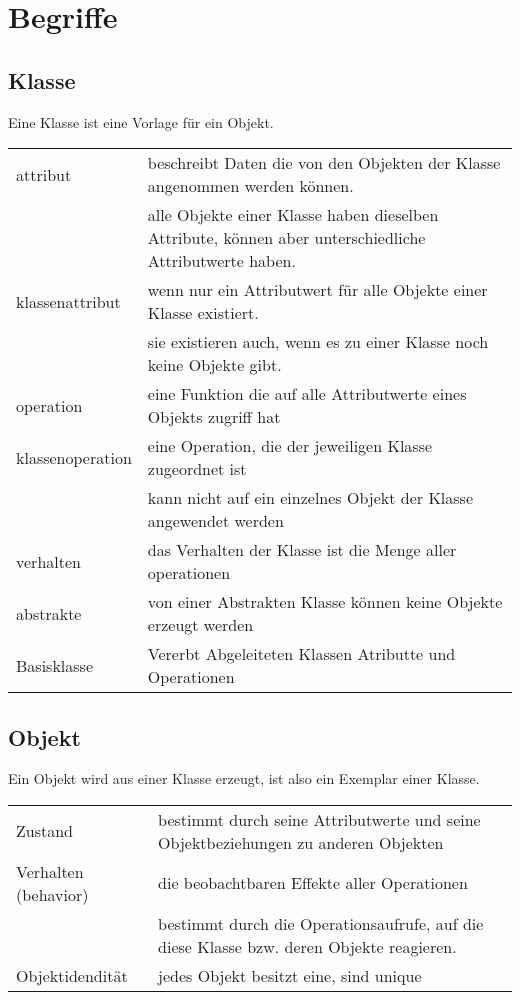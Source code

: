 \section{Begriffe}
\subsection{Klasse}
	Eine Klasse ist eine Vorlage für ein Objekt.\\
	\begin{tabular}{p{3.5cm}p{14.5cm}}
		attribut & beschreibt Daten die von den Objekten der Klasse angenommen werden
		können.\\
		& alle Objekte einer Klasse haben dieselben Attribute, können
		aber unterschiedliche Attributwerte haben.\\
		klassenattribut & wenn nur ein
		Attributwert für alle Objekte einer Klasse existiert.\\
		& sie existieren auch, wenn es zu einer Klasse noch keine Objekte gibt.\\
		operation & eine Funktion die auf alle Attributwerte eines Objekts zugriff
		hat\\
		klassenoperation & eine Operation, die der jeweiligen Klasse zugeordnet ist\\
		& kann nicht auf ein einzelnes Objekt der Klasse angewendet werden\\
		verhalten & das Verhalten der Klasse ist die Menge aller operationen\\
		abstrakte & von einer Abstrakten Klasse können keine Objekte erzeugt werden\\
		Basisklasse & Vererbt Abgeleiteten Klassen Atributte und Operationen \\
	\end{tabular}
\subsection{Objekt}
	Ein Objekt wird aus einer Klasse erzeugt, ist also ein Exemplar einer Klasse.\\
	\begin{tabular}{p{3.5cm}p{14.5cm}}
		Zustand & bestimmt durch seine Attributwerte und seine Objektbeziehungen zu
		anderen Objekten\\
		Verhalten (behavior) & die beobachtbaren Effekte aller Operationen\\
		& bestimmt durch die Operationsaufrufe, auf die diese Klasse bzw. deren Objekte
		reagieren.\\
		Objektidendität & jedes Objekt besitzt eine, sind unique\\
	\end{tabular}
